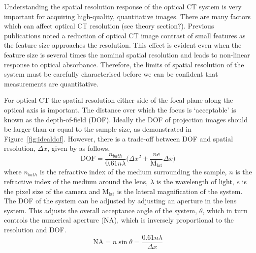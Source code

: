 Understanding the spatial resolution response of the optical CT system is very important for acquiring high-quality, quantitative images. There are many factors which can affect optical CT resolution (see theory section?).
Previous publications noted a reduction of optical CT image contrast of small features as the feature size approaches the resolution. \cite{doranultra-high2013} This effect is evident even when the feature size is several times the nominal spatial resolution and leads to non-linear response to optical absorbance. Therefore, the limits of spatial resolution of the system must be carefully characterised before we can be confident that measurements are quantitative. 

For optical CT the spatial resolution either side of the focal plane along the optical axis is important. The distance over which the focus is `acceptable' is known as the depth-of-field (DOF).
Ideally the DOF of projection images should be larger than or equal to the sample size, as demonstrated in Figure~\ref{fig:idealdof}. However, there is a trade-off between DOF and spatial resolution,  $\Delta x$, given by \cite{inoue1997video} as follows,
\begin{equation}
\mathrm{DOF} = \frac{n_{bath}}{0.61 n \lambda} \big(\Delta x^2 + \frac{ne}{\mathrm{M_{lat}}} \Delta x \big)
\label{eqn:1DOF}
\end{equation}
where $n_{bath}$ is the refractive index of the medium surrounding the sample, $n$ is the refractive index of the medium around the lens, $\lambda$ is the wavelength of light, $e$ is the pixel size of the camera and $\mathrm{M_{lat}}$ is the lateral magnification of the system. The DOF of the system can be adjusted by adjusting an aperture in the lens system. This adjusts the overall acceptance angle of the system, $\theta$, which in turn controls the numerical aperture (NA), which is inversely proportional to the resolution and DOF.
\begin{equation}
\mathrm{NA} = n \sin \theta = \frac{0.61n\lambda}{\Delta x}
\label{eqn:2NA}
\end{equation}


